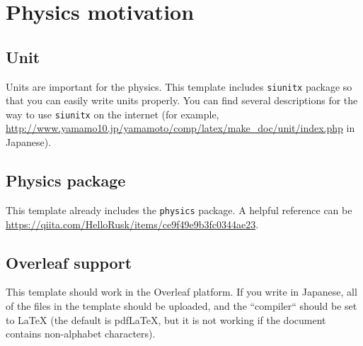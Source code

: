 \chapter{Physics motivation}

\section{Unit}

Units are important for the physics. This template includes \texttt{siunitx} package so that you can easily write units properly. You can find several descriptions for the way to use \texttt{siunitx} on the internet (for example, \url{http://www.yamamo10.jp/yamamoto/comp/latex/make_doc/unit/index.php} in Japanese).  

\section{Physics package}

This template already includes the \texttt{physics} package. A helpful reference can be \url{https://qiita.com/HelloRusk/items/ce9f49e9b3fc0344ae23}. 


\section{Overleaf support}

This template should work in the Overleaf platform. If you write in Japanese, all of the files in the template should be uploaded, and the ``compiler`` should be set to LaTeX (the default is pdfLaTeX, but it is not working if the document contains non-alphabet characters). 
